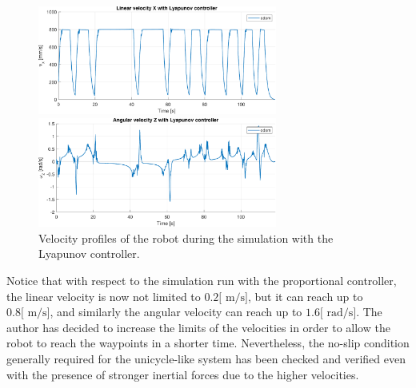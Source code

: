 \begin{figure}[H]
    \centering
    \includegraphics[width=0.7\textwidth]{./img/MATLAB/linear_velocity_lyapunov.pdf}

    \vspace{10pt}

    \includegraphics[width=0.7\textwidth]{./img/MATLAB/angular_velocity_lyapunov.pdf}
    \caption{Velocity profiles of the robot during the simulation with the Lyapunov controller.}
    \label{fig:lyapunov_controller_velocity_profiles}
\end{figure}

Notice that with respect to the simulation run with the proportional controller, the linear velocity is now not limited to $0.2 \text{[ m/s]}$, but it can reach up to $0.8 \text{[ m/s]}$, and similarly the angular velocity can reach up to $1.6 \text{[ rad/s]}$.
The author has decided to increase the limits of the velocities in order to allow the robot to reach the waypoints in a shorter time.
Nevertheless, the no-slip condition generally required for the unicycle-like system has been checked and verified even with the presence of stronger inertial forces due to the higher velocities.
